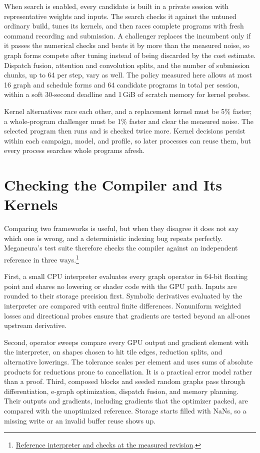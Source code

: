 \documentclass[conference]{IEEEtran}
\newcommand{\system}{Meganeura}
\begin{document}
When search is enabled, every candidate is built in a private session with
representative weights and inputs. The search checks it against the untuned
ordinary build, tunes its kernels, and then races complete programs with fresh
command recording and submission. A challenger replaces the incumbent only
if it passes the numerical checks and beats it by more than the measured
noise, so graph forms compete after tuning instead of being discarded by the
cost estimate. Dispatch fusion, attention and convolution splits, and the
number of submission chunks, up to 64 per step, vary as well. The policy
measured here allows at most 16 graph and schedule forms and 64 candidate
programs in total per session, within a soft 30-second deadline and 1\,GiB
of scratch memory for kernel probes.

Kernel alternatives race each other, and a replacement kernel must be 5\%
faster; a whole-program challenger must be 1\% faster and clear the measured
noise. The selected program then runs and is checked twice more. Kernel
decisions persist within each campaign, model, and profile, so later
processes can reuse them, but every process searches whole programs afresh.

\section{Checking the Compiler and Its Kernels}
\label{sec:validation}

Comparing two frameworks is useful, but when they disagree it does not say
which one is wrong, and a deterministic indexing bug repeats perfectly. \system{}'s test suite therefore checks the compiler
against an independent reference in three
ways.\footnote{\href{https://github.com/kvark/meganeura/tree/567028b8aedd90be7abc61de61f6197018711398e/src/reference}{Reference interpreter and checks at the measured revision}.}

First, a small CPU interpreter evaluates every graph operator in 64-bit
floating point and shares no lowering or shader code with the GPU path.
Inputs are rounded to their storage precision first. Symbolic derivatives
evaluated by the interpreter are compared with central finite differences.
Nonuniform weighted losses and directional probes ensure that gradients are
tested beyond an all-ones upstream derivative.

Second, operator sweeps compare every GPU output and gradient element with the
interpreter, on shapes chosen to hit tile edges, reduction splits, and
alternative lowerings. The tolerance scales per element and uses sums of
absolute products for reductions prone to cancellation. It is a practical
error model rather than a proof. Third, composed blocks and seeded random
graphs pass through differentiation, e-graph optimization, dispatch fusion,
and memory planning. Their outputs and gradients, including gradients that
the optimizer packed, are compared with the unoptimized reference. Storage
starts filled with NaNs, so a missing write or an invalid buffer reuse shows
up.
\end{document}
